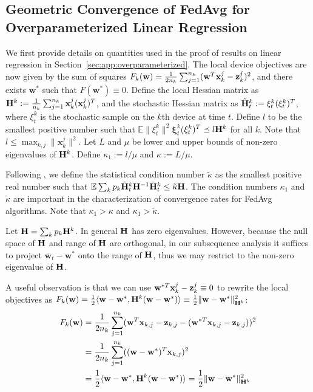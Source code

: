 \subsection{Geometric Convergence of FedAvg for Overparameterized Linear Regression}

We first provide details on quantities used in the proof of results on linear regression in Section~\ref{sec:app:overparameterized}. The local device objectives are now given by the sum of squares {\small$F_{k}(\mathbf{w})=\frac{1}{2n_{k}}\sum_{j=1}^{n_{k}}(\mathbf{w}^{T}\mathbf{x}_{k}^{j}-{\mathbf{z}}_{k}^{j})^{2}$},
and there exists $\mathbf{w}^{\ast}$ such that $F(\mathbf{w}^{\ast})\equiv0$. 
Define the local Hessian matrix as ${\mathbf{H}}^{k}:=\frac{1}{n_{k}}\sum_{j=1}^{n_{k}}\mathbf{x}_{k}^{j}(\mathbf{x}_{k}^{j})^{T}$, and the stochastic Hessian matrix as $\tilde{{\mathbf{H}}}_{t}^{k}:=\xi_{t}^{k}(\xi_{t}^{k})^{T}$, where $\xi_{t}^{k}$ is the stochastic sample on the $k$th device at
time $t$. Define $l$ to be the smallest positive number such that $\mathbb{E}\|\xi_{t}^{k}\|^{2}$$\mathbf{\xi}_{t}^{k}$($\mathbf{\xi}_{t}^{k})^{T}\preceq l{\mathbf{H}}^{k}$ for all $k$. Note that $l\leq\max_{k,j}\|\mathbf{x}_{k}^{j}\|^{2}$.
Let $L$ and $\mu$ be lower and upper bounds of non-zero eigenvalues
of ${\mathbf{H}}^{k}$. Define $\kappa_{1}:=l/\mu$ and $\kappa:=L/\mu$. 

Following
\cite{liu2018accelerating,jain2017accelerating}, we define the statistical
condition number $\tilde{\kappa}$ as the smallest positive real number
such that $\mathbb{E}\sum_{k}p_{k}\tilde{{\mathbf{H}}}_{t}^{k}{\mathbf{H}}^{-1}\tilde{{\mathbf{H}}}_{t}^{k}\leq\tilde{\kappa}{\mathbf{H}}$. 
The condition numbers $\kappa_{1}$ and $\tilde{\kappa}$
are important in the characterization of convergence rates for FedAvg
algorithms. Note that $\kappa_{1}>\kappa$ and $\kappa_{1}>\tilde{\kappa}$.


Let ${\mathbf{H}}=\sum_{k}p_k{\mathbf{H}}^k$. In general ${\mathbf{H}}$ has zero eigenvalues. However, because the null space
of ${\mathbf{H}}$ and range of ${\mathbf{H}}$ are orthogonal, in our subsequence analysis
it suffices to project $\overline{\mathbf{w}}_{t}-\mathbf{w}^{\ast}$
onto the range of ${\mathbf{H}}$, thus we may restrict to the non-zero eigenvalue
of ${\mathbf{H}}$. 

A useful observation is that we can use $\mathbf{w}^{\ast T}\mathbf{x}_{k}^{j}-{\mathbf{z}}_{k}^{j}\equiv0$
to rewrite the local objectives as $F_{k}(\mathbf{w})=\frac{1}{2}\langle\mathbf{w}-\mathbf{w}^{\ast},{\mathbf{H}}^{k}(\mathbf{w}-\mathbf{w}^{\ast})\rangle\equiv\frac{1}{2}\|\mathbf{w}-\mathbf{w}^{\ast}\|_{{\mathbf{H}}^{k}}^{2}$:
\begin{align*}
F_{k}({\mathbf{w}}) & =\frac{1}{2n_{k}}\sum_{j=1}^{n_{k}}({\mathbf{w}}^{T}{\mathbf{x}}_{k,j}-{\mathbf{z}}_{k,j}-({\mathbf{w}}^{\ast T}{\mathbf{x}}_{k,j}-{\mathbf{z}}_{k,j}))^{2}\\
& =\frac{1}{2n_{k}}\sum_{j=1}^{n_{k}}(({\mathbf{w}}-{\mathbf{w}}^{\ast})^{T}{\mathbf{x}}_{k,j})^{2}\\
& =\frac{1}{2}\langle {\mathbf{w}}-{\mathbf{w}}^{\ast},{\mathbf{H}}^{k}({\mathbf{w}}-{\mathbf{w}}^{\ast})\rangle=\frac{1}{2}\|{\mathbf{w}}-{\mathbf{w}}^{\ast}\|_{{\mathbf{H}}^{k}}^{2}
\end{align*}

